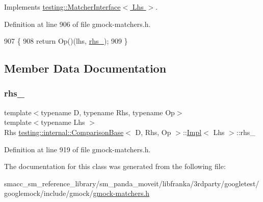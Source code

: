 Implements \hyperlink{classtesting_1_1MatcherInterface_a296b43607cd99d60365f0e6a762777cf}{testing\+::\+Matcher\+Interface$<$ Lhs $>$}.



Definition at line 906 of file gmock-\/matchers.\+h.


\begin{DoxyCode}
907                                                \{
908       \textcolor{keywordflow}{return} Op()(lhs, \hyperlink{classtesting_1_1internal_1_1ComparisonBase_1_1Impl_aa665caf1136e3a09f8019296ccbdea44}{rhs\_});
909     \}
\end{DoxyCode}


\subsection{Member Data Documentation}
\mbox{\label{classtesting_1_1internal_1_1ComparisonBase_1_1Impl_aa665caf1136e3a09f8019296ccbdea44}} 
\subsubsection{\texorpdfstring{rhs\+\_\+}{rhs\_}}
{\footnotesize\ttfamily template$<$typename D, typename Rhs, typename Op$>$ \\
template$<$typename Lhs $>$ \\
Rhs \hyperlink{classtesting_1_1internal_1_1ComparisonBase}{testing\+::internal\+::\+Comparison\+Base}$<$ D, Rhs, Op $>$\+::\hyperlink{classtesting_1_1internal_1_1ComparisonBase_1_1Impl}{Impl}$<$ Lhs $>$\+::rhs\+\_\+\hspace{0.3cm}{\ttfamily [private]}}



Definition at line 919 of file gmock-\/matchers.\+h.



The documentation for this class was generated from the following file\+:\begin{DoxyCompactItemize}
\item 
smacc\+\_\+sm\+\_\+reference\+\_\+library/sm\+\_\+panda\+\_\+moveit/libfranka/3rdparty/googletest/googlemock/include/gmock/\hyperlink{gmock-matchers_8h}{gmock-\/matchers.\+h}\end{DoxyCompactItemize}
